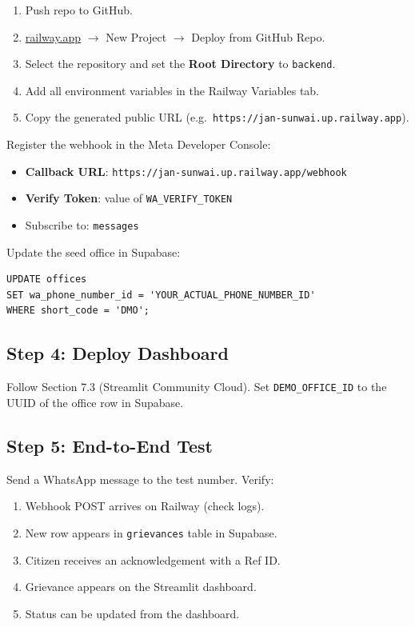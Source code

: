 \documentclass[11pt, a4paper]{article}
\begin{document}
\begin{enumerate}[leftmargin=1.5em]
  \item Push repo to GitHub.
  \item \href{https://railway.app}{railway.app} $\rightarrow$ New Project $\rightarrow$ Deploy from GitHub Repo.
  \item Select the repository and set the \textbf{Root Directory} to \texttt{backend}.
  \item Add all environment variables in the Railway Variables tab.
  \item Copy the generated public URL (e.g.\ \texttt{https://jan-sunwai.up.railway.app}).
\end{enumerate}

Register the webhook in the Meta Developer Console:
\begin{itemize}
  \item \textbf{Callback URL}: \texttt{https://jan-sunwai.up.railway.app/webhook}
  \item \textbf{Verify Token}: value of \texttt{WA\_VERIFY\_TOKEN}
  \item Subscribe to: \texttt{messages}
\end{itemize}

Update the seed office in Supabase:
\begin{lstlisting}[style=sql]
UPDATE offices
SET wa_phone_number_id = 'YOUR_ACTUAL_PHONE_NUMBER_ID'
WHERE short_code = 'DMO';
\end{lstlisting}

\subsection{Step 4: Deploy Dashboard}

Follow Section 7.3 (Streamlit Community Cloud). Set \texttt{DEMO\_OFFICE\_ID} to the UUID of the office row in Supabase.

\subsection{Step 5: End-to-End Test}

Send a WhatsApp message to the test number. Verify:
\begin{enumerate}[leftmargin=1.5em]
  \item Webhook POST arrives on Railway (check logs).
  \item New row appears in \texttt{grievances} table in Supabase.
  \item Citizen receives an acknowledgement with a Ref ID.
  \item Grievance appears on the Streamlit dashboard.
  \item Status can be updated from the dashboard.
\end{enumerate}
\end{document}
